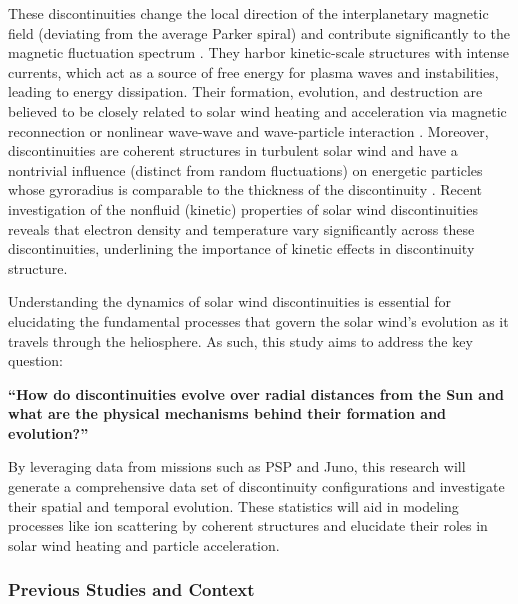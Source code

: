 \documentclass[
  letterpaper,
  DIV=11,
  numbers=noendperiod]{scrartcl}
\begin{document}
These discontinuities change the local direction of the interplanetary magnetic field (deviating from the average Parker spiral) and contribute significantly to the magnetic fluctuation spectrum \citep{borovskyContributionStrongDiscontinuities2010}. They harbor kinetic-scale structures with intense currents, which act as a source of free energy for plasma waves and instabilities, leading to energy dissipation\citep{dmitrukTestParticleEnergization2004, macbrideTurbulentCascade12008, osmanIntermittencyLocalHeating2012, tesseinAssociationSuprathermalParticles2013}. Their formation, evolution, and destruction are believed to be closely related to solar wind heating and acceleration via magnetic reconnection \citep{dmitrukTestParticleEnergization2004} or nonlinear wave-wave and wave-particle interaction \citep{medvedevDissipativeDynamicsCollisionless1997}. Moreover, discontinuities are coherent structures in turbulent solar wind and have a nontrivial influence (distinct from random fluctuations) on energetic particles whose gyroradius is comparable to the thickness of the discontinuity \citep{malaraChargedparticleChaoticDynamics2021}. Recent investigation of the nonfluid (kinetic) properties of solar wind discontinuities \citep{artemyevKineticNatureSolar2019} reveals that electron density and temperature vary significantly across these discontinuities, underlining the importance of kinetic effects in discontinuity structure.

Understanding the dynamics of solar wind discontinuities is essential for elucidating the fundamental processes that govern the solar wind's evolution as it travels through the heliosphere. As such, this study aims to address the key question:

\textbf{``How do discontinuities evolve over radial distances from the Sun and what are the physical mechanisms behind their formation and evolution?''}

By leveraging data from missions such as PSP and Juno, this research will generate a comprehensive data set of discontinuity configurations and investigate their spatial and temporal evolution. These statistics will aid in modeling processes like ion scattering by coherent structures and elucidate their roles in solar wind heating and particle acceleration.

\subsubsection{Previous Studies and Context}\label{previous-studies-and-context}
\end{document}

